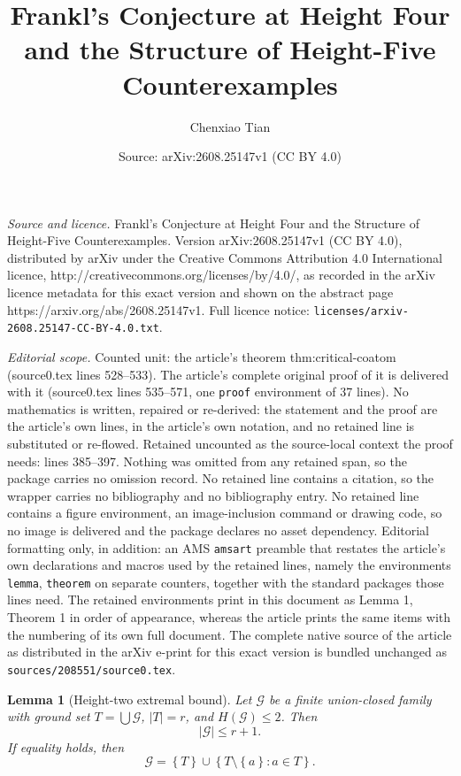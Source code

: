 \documentclass[10pt,a4paper]{amsart}
\title{Frankl's Conjecture at Height Four and the Structure of Height-Five Counterexamples}
\author{Chenxiao Tian}
\date{Source: arXiv:2608.25147v1 (CC BY 4.0)}
\newtheorem{lemma}{Lemma}
\newcommand{\G}{\mathcal{G}}
\newcommand{\abs}[1]{\left|#1\right|}
\newcommand{\set}[1]{\left\{#1\right\}}
\begin{document}
\maketitle

\noindent\emph{Source and licence.} Frankl's Conjecture at Height Four and the Structure of Height-Five Counterexamples. Version arXiv:2608.25147v1 (CC BY 4.0), distributed by arXiv under the Creative Commons Attribution 4.0 International licence, http://creativecommons.org/licenses/by/4.0/, as recorded in the arXiv licence metadata for this exact version and shown on the abstract page https://arxiv.org/abs/2608.25147v1. Full licence notice: \texttt{licenses/arxiv-2608.25147-CC-BY-4.0.txt}.\par\smallskip

\noindent\textit{Editorial scope.} Counted unit: the article's theorem thm:critical-coatom (source0.tex lines 528--533). The article's complete original proof of it is delivered with it (source0.tex lines 535--571, one \texttt{proof} environment of 37 lines). No mathematics is written, repaired or re-derived: the statement and the proof are the article's own lines, in the article's own notation, and no retained line is substituted or re-flowed.  Retained uncounted as the source-local context the proof needs: lines 385--397.  Nothing was omitted from any retained span, so the package carries no omission record.  No retained line contains a citation, so the wrapper carries no bibliography and no bibliography entry.  No retained line contains a figure environment, an image-inclusion command or drawing code, so no image is delivered and the package declares no asset dependency.  Editorial formatting only, in addition: an AMS \texttt{amsart} preamble that restates the article's own declarations and macros used by the retained lines, namely the environments \texttt{lemma}, \texttt{theorem} on separate counters, together with the standard packages those lines need.  The retained environments print in this document as Lemma 1, Theorem 1 in order of appearance, whereas the article prints the same items with the numbering of its own full document.  The complete native source of the article as distributed in the arXiv e-print for this exact version is bundled unchanged as \texttt{sources/208551/source0.tex}.
\begin{lemma}[Height-two extremal bound]\label{lem:height2-extremal}
Let \(\G\) be a finite union-closed family with ground set
\(
T=\bigcup\G
\), \(\abs{T}=r\), and \(H(\G)\le2\).  Then
\begin{equation}\label{eq:height2-size}
\abs{\G}\le r+1.
\end{equation}
If equality holds, then
\begin{equation}\label{eq:height2-equality}
\G=\set{T}\cup\set{T\setminus\set{a}:a\in T}.
\end{equation}
\end{lemma}
\end{document}
